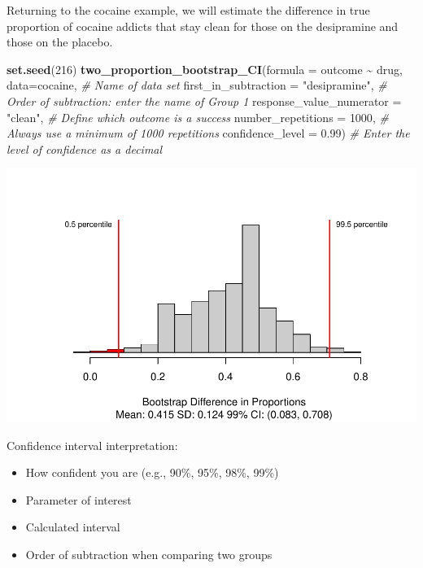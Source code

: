 \documentclass[
]{report}
\newenvironment{Shaded}{\begin{snugshade}}{\end{snugshade}}
\newcommand{\AttributeTok}[1]{\textcolor[rgb]{0.13,0.29,0.53}{#1}}
\newcommand{\CommentTok}[1]{\textcolor[rgb]{0.56,0.35,0.01}{\textit{#1}}}
\newcommand{\DecValTok}[1]{\textcolor[rgb]{0.00,0.00,0.81}{#1}}
\newcommand{\FloatTok}[1]{\textcolor[rgb]{0.00,0.00,0.81}{#1}}
\newcommand{\FunctionTok}[1]{\textcolor[rgb]{0.13,0.29,0.53}{\textbf{#1}}}
\newcommand{\NormalTok}[1]{#1}
\newcommand{\SpecialCharTok}[1]{\textcolor[rgb]{0.81,0.36,0.00}{\textbf{#1}}}
\newcommand{\StringTok}[1]{\textcolor[rgb]{0.31,0.60,0.02}{#1}}
\begin{document}
Returning to the cocaine example, we will estimate the difference in true proportion of cocaine addicts that stay clean for those on the desipramine and those on the placebo.

\begin{Shaded}
\begin{Highlighting}[]
\FunctionTok{set.seed}\NormalTok{(}\DecValTok{216}\NormalTok{)}
\FunctionTok{two\_proportion\_bootstrap\_CI}\NormalTok{(}\AttributeTok{formula =}\NormalTok{ outcome }\SpecialCharTok{\textasciitilde{}}\NormalTok{ drug, }
        \AttributeTok{data=}\NormalTok{cocaine, }\CommentTok{\# Name of data set}
        \AttributeTok{first\_in\_subtraction =} \StringTok{"desipramine"}\NormalTok{, }\CommentTok{\# Order of subtraction: enter the name of Group 1}
        \AttributeTok{response\_value\_numerator =} \StringTok{"clean"}\NormalTok{, }\CommentTok{\# Define which outcome is a success }
        \AttributeTok{number\_repetitions =} \DecValTok{1000}\NormalTok{, }\CommentTok{\# Always use a minimum of 1000 repetitions}
        \AttributeTok{confidence\_level =} \FloatTok{0.99}\NormalTok{) }\CommentTok{\# Enter the level of confidence as a decimal}
\end{Highlighting}
\end{Shaded}

\begin{center}\includegraphics[width=0.7\linewidth]{08-LN09-two-cat-simulation_files/figure-latex/unnamed-chunk-5-1} \end{center}

Confidence interval interpretation:

\begin{itemize}
\item
  How confident you are (e.g., 90\%, 95\%, 98\%, 99\%)
\item
  Parameter of interest
\item
  Calculated interval
\item
  Order of subtraction when comparing two groups
\end{itemize}
\end{document}
